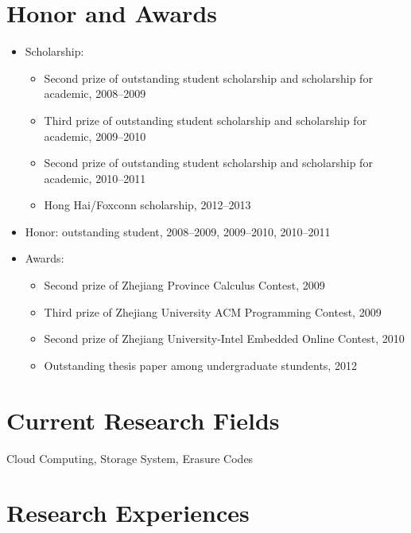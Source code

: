 \documentclass[letterpaper]{article}
\begin{document}
\section*{Honor and Awards}
\begin{itemize}
\item Scholarship:
    \begin{itemize}
    \item Second prize of outstanding student scholarship and scholarship for academic, 2008--2009
    \item Third prize of outstanding student scholarship and scholarship for academic, 2009--2010
    \item Second prize of outstanding student scholarship and scholarship for academic, 2010--2011
	\item Hong Hai/Foxconn scholarship, 2012--2013				
    \end{itemize}
\item Honor: outstanding student, 2008--2009, 2009--2010, 2010--2011
\item Awards:
    \begin{itemize}
    \item Second prize of Zhejiang Province Calculus Contest, 2009
    \item Third prize of Zhejiang University ACM Programming Contest, 2009
    \item Second prize of Zhejiang University-Intel Embedded Online Contest, 2010
    \item Outstanding thesis paper among undergraduate stundents, 2012
    \end{itemize}
\end{itemize}

\section*{Current Research Fields}
Cloud Computing, Storage System, Erasure Codes

\section*{Research Experiences}
\end{document}
